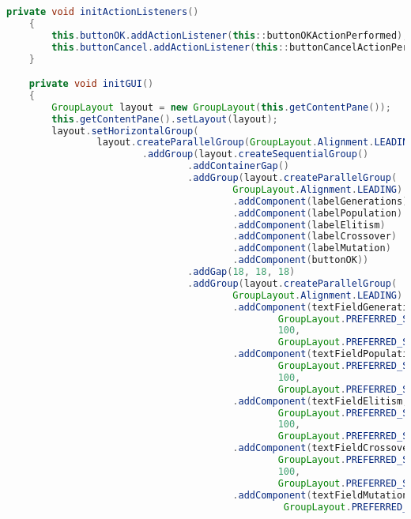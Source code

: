 \begin{lstlisting}[language=Java,basicstyle=\tiny,caption=GeneticParameters.java]
    private void initActionListeners()
    {   
        this.buttonOK.addActionListener(this::buttonOKActionPerformed);
        this.buttonCancel.addActionListener(this::buttonCancelActionPerformed);
    }

    private void initGUI()
    {
        GroupLayout layout = new GroupLayout(this.getContentPane());
        this.getContentPane().setLayout(layout);
        layout.setHorizontalGroup(
                layout.createParallelGroup(GroupLayout.Alignment.LEADING)
                        .addGroup(layout.createSequentialGroup()
                                .addContainerGap()
                                .addGroup(layout.createParallelGroup(
                                        GroupLayout.Alignment.LEADING)
                                        .addComponent(labelGenerations)
                                        .addComponent(labelPopulation)
                                        .addComponent(labelElitism)
                                        .addComponent(labelCrossover)
                                        .addComponent(labelMutation)
                                        .addComponent(buttonOK))
                                .addGap(18, 18, 18)
                                .addGroup(layout.createParallelGroup(
                                        GroupLayout.Alignment.LEADING)
                                        .addComponent(textFieldGenerations, 
                                                GroupLayout.PREFERRED_SIZE, 
                                                100, 
                                                GroupLayout.PREFERRED_SIZE)
                                        .addComponent(textFieldPopulation,
                                                GroupLayout.PREFERRED_SIZE, 
                                                100, 
                                                GroupLayout.PREFERRED_SIZE)
                                        .addComponent(textFieldElitism,
                                                GroupLayout.PREFERRED_SIZE, 
                                                100, 
                                                GroupLayout.PREFERRED_SIZE)
                                        .addComponent(textFieldCrossover,  
                                                GroupLayout.PREFERRED_SIZE, 
                                                100, 
                                                GroupLayout.PREFERRED_SIZE)
                                        .addComponent(textFieldMutation, 
                                                 GroupLayout.PREFERRED_SIZE, 

\end{lstlisting}
